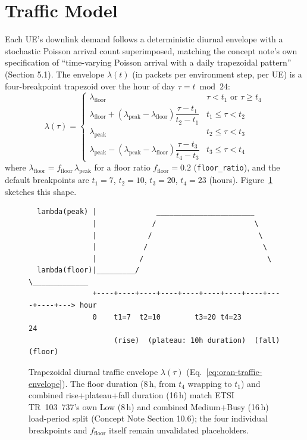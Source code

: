 \section{Traffic Model}
\label{sec:oran-traffic}

Each UE's downlink demand follows a deterministic diurnal envelope with a
stochastic Poisson arrival count superimposed, matching the concept note's
own specification of ``time-varying Poisson arrival with a daily
trapezoidal pattern'' (Section 5.1). The envelope $\lambda(t)$ (in packets
per environment step, per UE) is a four-breakpoint trapezoid over the hour
of day $\tau = t \bmod 24$:
\begin{equation}
  \lambda(\tau) =
  \begin{cases}
    \lambda_{\mathrm{floor}} & \tau < t_1 \text{ or } \tau \geq t_4 \\[2pt]
    \lambda_{\mathrm{floor}} + (\lambda_{\mathrm{peak}} - \lambda_{\mathrm{floor}})\dfrac{\tau - t_1}{t_2 - t_1} & t_1 \leq \tau < t_2 \\[6pt]
    \lambda_{\mathrm{peak}} & t_2 \leq \tau < t_3 \\[2pt]
    \lambda_{\mathrm{peak}} - (\lambda_{\mathrm{peak}} - \lambda_{\mathrm{floor}})\dfrac{\tau - t_3}{t_4 - t_3} & t_3 \leq \tau < t_4
  \end{cases}
  \label{eq:oran-traffic-envelope}
\end{equation}
where $\lambda_{\mathrm{floor}} = f_{\mathrm{floor}}\,\lambda_{\mathrm{peak}}$
for a floor ratio $f_{\mathrm{floor}}=0.2$ (\texttt{floor\_ratio}), and the
default breakpoints are $t_1=7$, $t_2=10$, $t_3=20$, $t_4=23$ (hours).
Figure~\ref{fig:oran-traffic-envelope} sketches this shape.

\begin{figure}[htbp]
\centering
\begin{verbatim}
  lambda(peak) |              _______________________
               |             /                       \
               |            /                         \
               |           /                           \
               |          /                             \
  lambda(floor)|_________/                               \_____________
               +----+----+----+----+----+----+----+----+----+----+---> hour
               0    t1=7  t2=10        t3=20 t4=23              24
                    (rise)  (plateau: 10h duration)  (fall)   (floor)
\end{verbatim}
\caption{Trapezoidal diurnal traffic envelope $\lambda(\tau)$
  (Eq.~\ref{eq:oran-traffic-envelope}). The floor duration (8\,h, from
  $t_4$ wrapping to $t_1$) and combined rise+plateau+fall duration
  (16\,h) match ETSI TR~103~737's own Low (8\,h) and combined
  Medium+Busy (16\,h) load-period split (Concept Note Section 10.6);
  the four individual breakpoints and $f_{\mathrm{floor}}$ itself
  remain unvalidated placeholders.}
\label{fig:oran-traffic-envelope}
\end{figure}

